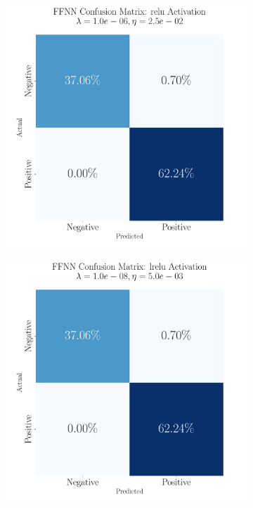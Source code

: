 \documentclass[%
reprint,s
amsmath,amssymb,
aps,
]{revtex4-2}
\begin{document}
\begin{figure}[b]
	\begin{subfigure}{0.325\textwidth}
		\includegraphics[width=\textwidth]{Figures/ConfusionMatrixFFNN_relu_Epochs100_randomstate42.pdf}
	\end{subfigure}
	\hfill
	\begin{subfigure}{0.325\textwidth}
		\includegraphics[width=\textwidth]{Figures/ConfusionMatrixFFNN_lrelu_Epochs100_randomstate42.pdf}

\end{subfigure}
\end{figure}
\end{document}
